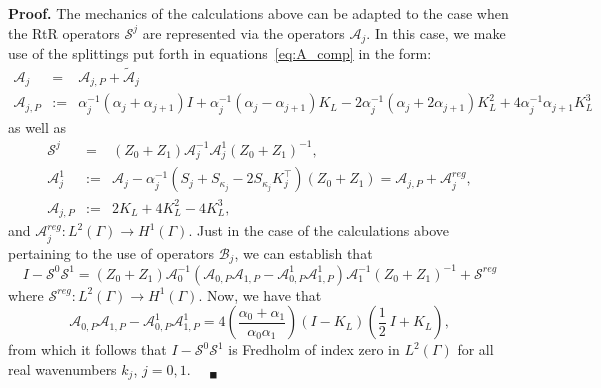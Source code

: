 \documentclass[11pt]{article}
\numberwithin{equation}{section}
\newenvironment{proof}{\hspace{0.5cm} {\bf Proof.}}
{$\quad {}_\blacksquare$\vspace{0.3cm}}
\begin{document}
\begin{proof}
  The mechanics of the calculations above can be adapted to the case when the RtR operators $\mathcal{S}^j$ are represented via the operators $\mathcal{A}_j$. In this case, we make use of the splittings put forth in equations~\eqref{eq:A_comp} in the form:
  \begin{eqnarray*}
    \mathcal{A}_j&=&\mathcal{A}_{j,P}+\widetilde{\mathcal{A}}_j\\
    \mathcal{A}_{j,P}&:=&\alpha_j^{-1}(\alpha_j+\alpha_{j+1})I+\alpha_j^{-1}(\alpha_j-\alpha_{j+1})K_L-2\alpha_j^{-1}(\alpha_j+2\alpha_{j+1})K_L^2+4\alpha_j^{-1}\alpha_{j+1}K_L^3
  \end{eqnarray*}
  as well as
  \begin{eqnarray*}
    \mathcal{S}^j&=&(Z_0+Z_1)\mathcal{A}_j^{-1}\mathcal{A}_j^1(Z_0+Z_1)^{-1},\\
    \mathcal{A}_j^1&:=&\mathcal{A}_j-\alpha_j^{-1}(S_j+S_{\kappa_j}-2S_{\kappa_j}K_j^\top)(Z_0+Z_1)=\mathcal{A}_{j,P}+\mathcal{A}_j^{reg},\\
    \mathcal{A}_{j,P}&:=&2K_L+4K_L^2-4K_L^3,
  \end{eqnarray*}
  and $\mathcal{A}_j^{reg}:L^2(\Gamma)\to H^1(\Gamma)$. Just in the case of the calculations above pertaining to the use of operators $\mathcal{B}_j$, we can establish that
  \[
  I-\mathcal{S}^0\mathcal{S}^1=(Z_0+Z_1)\mathcal{A}_0^{-1}(\mathcal{A}_{0,P}\mathcal{A}_{1,P}-\mathcal{A}_{0,P}^1\mathcal{A}_{1,P}^1)\mathcal{A}_1^{-1}(Z_0+Z_1)^{-1}+\mathcal{S}^{reg}
  \]
  where $\mathcal{S}^{reg}:L^2(\Gamma)\to H^1(\Gamma)$. Now, we have that
  \[
  \mathcal{A}_{0,P}\mathcal{A}_{1,P}-\mathcal{A}_{0,P}^1\mathcal{A}_{1,P}^1=4\left(\frac{\alpha_0+\alpha_1}{\alpha_0\alpha_1}\right)(I-K_L)\left(\frac{1}{2}\ I+K_L\right),
  \]
  from which it follows that $I-\mathcal{S}^0\mathcal{S}^1$ is Fredholm of index zero in $L^2(\Gamma)$ for all real wavenumbers $k_j$, $j=0,1$. \end{proof}
  
\end{document}
